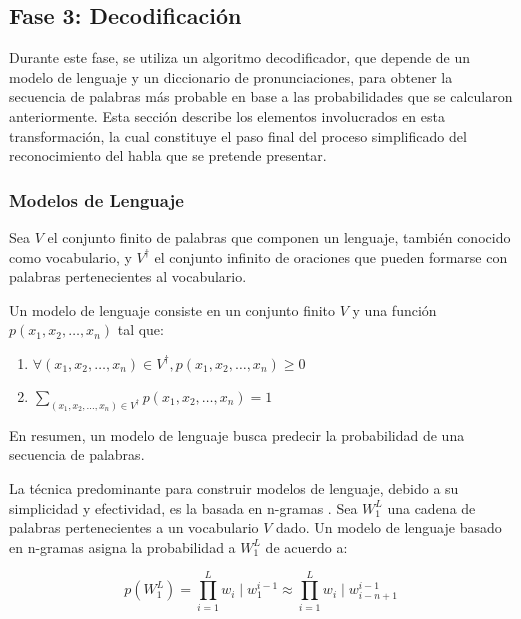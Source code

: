 \subsection{Fase 3: Decodificaci\'on}
\label{sec:decoding}

Durante este fase, se utiliza un algoritmo decodificador, que depende de un modelo de lenguaje y un diccionario de
pronunciaciones, para obtener la secuencia de palabras m\'as probable en base a las probabilidades que se calcularon 
anteriormente. Esta secci\'on describe los elementos involucrados en esta transformaci\'on, la cual constituye el paso
final del proceso simplificado del reconocimiento del habla que se pretende presentar.

\subsubsection{Modelos de Lenguaje}
Sea $V$ el conjunto finito de palabras que componen un lenguaje, tambi\'en conocido como vocabulario, y $V^\dag$ el 
conjunto infinito de oraciones que pueden formarse con palabras pertenecientes al vocabulario.

Un modelo de lenguaje \cite{CollinsLanguage} consiste en un conjunto finito $V$ y una funci\'on $p(x_1,x_2,\ldots,x_n)$ tal que:
\begin{enumerate}

\item $\forall (x_1,x_2,\ldots,x_n) \in V^\dag, p(x_1,x_2,\ldots,x_n) \ge 0$

\item $\displaystyle \sum_{(x_1,x_2,\ldots,x_n) \in V^\dag} p(x_1,x_2,\ldots,x_n) = 1$
\end{enumerate}

En resumen, un modelo de lenguaje busca predecir la probabilidad de una secuencia de palabras. 

La t\'ecnica predominante para construir modelos de lenguaje, debido a su simplicidad y efectividad, es la basada en 
n-gramas \cite{GaoComparative2010}. Sea $W^L_1$ una cadena de palabras pertenecientes a un vocabulario $V$ dado. Un modelo de 
lenguaje basado en n-gramas asigna la probabilidad a $W^L_1$ de acuerdo a:

\begin{equation*}
p(W^L_1) = \displaystyle \prod^L_{i = 1} w_i \mid w^{i - 1}_1 \approx \displaystyle \prod^L_{i = 1} w_i \mid w^{i - 1}_{i - n + 1}
\end{equation*}

